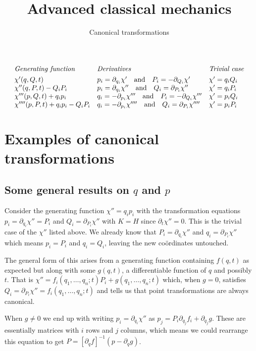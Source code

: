 \documentclass[english,seminar,headertitle]{lecture}
\title{Advanced classical mechanics}
\subtitle{Canonical transformations}
\author{}
\date{}{}{}
\begin{document}
\[
\begin{array}{lll}
	\textrm{\textit{Generating function}} & \textrm{\textit{Derivatives}} & \textrm{\textit{Trivial case}}\\[0.35em]
	\chi'(q,Q,t) & p_i = \partial_{q_i} \chi' \quad\textrm{and}\quad P_i = - \partial_{Q_i} \chi' & \chi' = q_iQ_i \\
	\chi''(q,P,t) - Q_iP_i & p_i = \partial_{q_i} \chi'' \quad\textrm{and}\quad Q_i = \partial_{P_i} \chi'' & \chi' = q_iP_i \\
	\chi'''(p,Q,t) + q_ip_i & q_i = - \partial_{p_i}\chi''' \quad\textrm{and}\quad P_i = - \partial_{Q_i}\chi''' & \chi' = p_iQ_i \\
	\chi''''(p,P,t) + q_ip_i - Q_iP_i & q_i = - \partial_{p_i} \chi'''' \quad\textrm{and}\quad Q_i = \partial_{P_i} \chi'''' & \chi' = p_iP_i
\end{array}
\]

\section{Examples of canonical transformations}

\subsection{Some general results on $q$ and $p$}

Consider the generating function $\chi'' = q_i p_i$ with the transformation equations $p_i = \partial_{q_i}\chi'' = P_i$ and $Q_i = \partial_{P_i} \chi''$ with $K=H$ since $\partial_t \chi'' = 0$. This is the trivial case of the $\chi''$ listed above. We already know that $P_i = \partial_{q_i}\chi''$ and $q_i = \partial_{P_i} \chi''$ which means $p_i = P_i$ and $q_i = Q_i$, leaving the new co\"{o}rdinates untouched.

The general form of this arises from a generating function containing $f(q,t)$ as expected but along with some $g(q,t)$, a differentiable function of $q$ and possibly $t$. That is $\chi'' = f_i (q_1, \ldots, q_n; t) P_i + g(q_1,\ldots,q_n;t)$ which, when $g = 0$, satisfies $Q_i = \partial_{P_i}\chi'' = f_i(q_1,\ldots,q_n;t)$ and tells us that point transformations are always canonical.

When $g \neq 0$ we end up with writing $p_i = \partial_{q_i}\chi''$ as $p_j = P_i\partial_{q_j}f_i + \partial_{q_j}g$. These are essentially matrices with $i$ rows and $j$ columns, which means we could rearrange this equation to get $P = \left[ \partial_{q} f \right]^{-1} \left( p - \partial_{q} g \right)$.\newline
\end{document}
